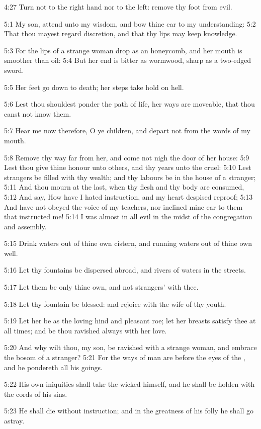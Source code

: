 4:27 Turn not to the right hand nor to the left: remove thy foot from
evil.

5:1 My son, attend unto my wisdom, and bow thine ear to my
understanding: 5:2 That thou mayest regard discretion, and that thy
lips may keep knowledge.

5:3 For the lips of a strange woman drop as an honeycomb, and her
mouth is smoother than oil: 5:4 But her end is bitter as wormwood,
sharp as a two-edged sword.

5:5 Her feet go down to death; her steps take hold on hell.

5:6 Lest thou shouldest ponder the path of life, her ways are
moveable, that thou canst not know them.

5:7 Hear me now therefore, O ye children, and depart not from the
words of my mouth.

5:8 Remove thy way far from her, and come not nigh the door of her
house: 5:9 Lest thou give thine honour unto others, and thy years unto
the cruel: 5:10 Lest strangers be filled with thy wealth; and thy
labours be in the house of a stranger; 5:11 And thou mourn at the
last, when thy flesh and thy body are consumed, 5:12 And say, How have
I hated instruction, and my heart despised reproof; 5:13 And have not
obeyed the voice of my teachers, nor inclined mine ear to them that
instructed me!  5:14 I was almost in all evil in the midst of the
congregation and assembly.

5:15 Drink waters out of thine own cistern, and running waters out of
thine own well.

5:16 Let thy fountains be dispersed abroad, and rivers of waters in
the streets.

5:17 Let them be only thine own, and not strangers' with thee.

5:18 Let thy fountain be blessed: and rejoice with the wife of thy
youth.

5:19 Let her be as the loving hind and pleasant roe; let her breasts
satisfy thee at all times; and be thou ravished always with her love.

5:20 And why wilt thou, my son, be ravished with a strange woman, and
embrace the bosom of a stranger?  5:21 For the ways of man are before
the eyes of the \LORD, and he pondereth all his goings.

5:22 His own iniquities shall take the wicked himself, and he shall be
holden with the cords of his sins.

5:23 He shall die without instruction; and in the greatness of his
folly he shall go astray.

